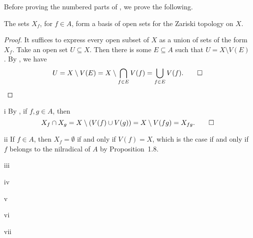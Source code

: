 Before proving the numbered parts of , we prove the following.

\begin{claim}
The sets \(X_f\), for \(f \in A\), form a basis of open sets for the Zariski topology on \(X\).
\end{claim}

\begin{proof}
It suffices to express every open subset of \(X\) as a union of sets of the form \(X_f\).
Take an open set \(U \subseteq X\).
Then there is some \(E \subseteq A\) such that \(U = X \setminus V(E)\).
By , we have
\begin{equation*}
U
= X \setminus V(E)
= X \setminus \bigcap_{f \in E} V(f)
= \bigcup_{f \in E} V(f).
\qedhere
\end{equation*}
\end{proof}

\begin{partsolution}{i}
By , if \(f, g \in A\), then
\begin{equation*}
X_f \cap X_g = X \setminus (V(f) \cup V(g)) = X \setminus V(f g) = X_{f g}.
\qedhere
\end{equation*}
\end{partsolution}

\begin{partsolution}{ii}
If \(f \in A\), then \(X_f = \emptyset\) if and only if \(V(f) = X\), which is the case if and only if \(f\) belongs to the nilradical of \(A\) by Proposition~1.8.
\end{partsolution}

\begin{partsolution}{iii}

\end{partsolution}

\begin{partsolution}{iv}

\end{partsolution}

\begin{partsolution}{v}

\end{partsolution}

\begin{partsolution}{vi}

\end{partsolution}

\begin{partsolution}{vii}

\end{partsolution}